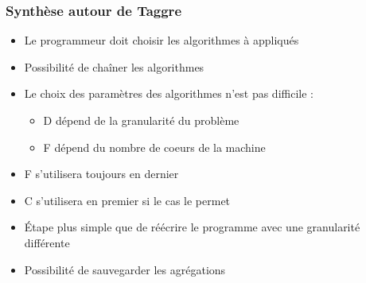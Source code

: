 \documentclass{beamer}
\begin{document}
\begin{frame}
  \frametitle{Synthèse autour de Taggre}

  \begin{itemize}
    \item Le programmeur doit choisir les algorithmes à appliqués
    \item Possibilité de chaîner les algorithmes
    \item Le choix des paramètres des algorithmes n'est pas difficile :
      \begin{itemize}
        \item D dépend de la granularité du problème
        \item F dépend du nombre de coeurs de la machine
      \end{itemize}
    \item F s'utilisera toujours en dernier
    \item C s'utilisera en premier si le cas le permet
    \item \'Etape plus simple que de réécrire le programme avec une granularité différente
    \item Possibilité de sauvegarder les agrégations
  \end{itemize}

\end{frame}


\end{document}
